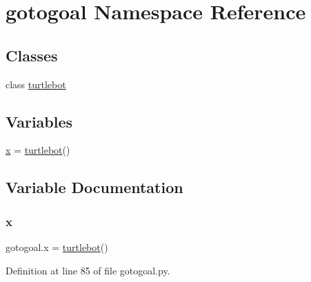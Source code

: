 \hypertarget{namespacegotogoal}{}\section{gotogoal Namespace Reference}
\label{namespacegotogoal}
\subsection*{Classes}
\begin{DoxyCompactItemize}
\item 
class \hyperlink{classgotogoal_1_1turtlebot}{turtlebot}
\end{DoxyCompactItemize}
\subsection*{Variables}
\begin{DoxyCompactItemize}
\item 
\hyperlink{namespacegotogoal_ab867b6862e1d3cdd887124afd57b29d0}{x} = \hyperlink{classgotogoal_1_1turtlebot}{turtlebot}()
\end{DoxyCompactItemize}


\subsection{Variable Documentation}
\mbox{\label{namespacegotogoal_ab867b6862e1d3cdd887124afd57b29d0}} 
\subsubsection{\texorpdfstring{x}{x}}
{\footnotesize\ttfamily gotogoal.\+x = \hyperlink{classgotogoal_1_1turtlebot}{turtlebot}()}



Definition at line 85 of file gotogoal.\+py.

